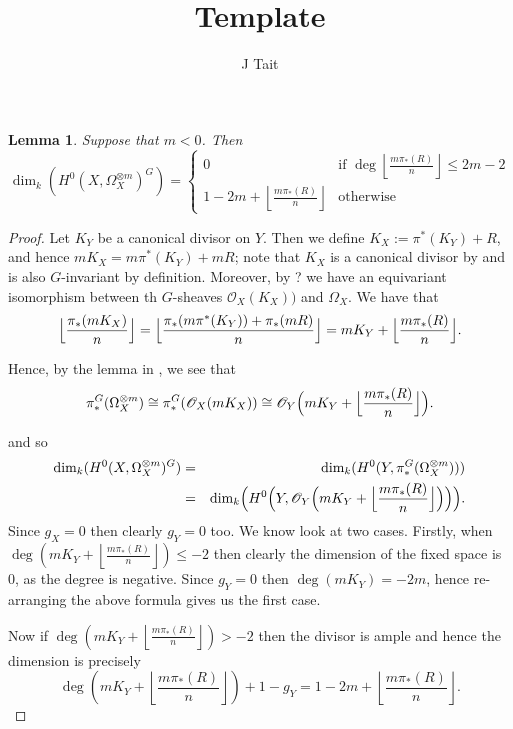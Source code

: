 \documentclass[11pt]{article} %
\title{Template}
\author{J Tait}
\newtheorem{lem}{Lemma}
\begin{document}
\maketitle

\begin{lem}
  Suppose that $m<0$. Then
  \begin{equation*}
    \dim_k(H^0(X,\Omega_X^{\otimes m})^G)=
      \begin{cases}
	0 & \mbox{if }\deg\left\lfloor \frac{m\pi_*(R)}{n} \right\rfloor\leq 2m-2\\
	1-2m+\left\lfloor \frac{m\pi_*(R)}{n} \right\rfloor & \mbox{otherwise}
      \end{cases}
  \end{equation*}
\end{lem}
\begin{proof}
  Let $K_Y$ be a canonical divisor on $Y$. Then we define $K_X:=\pi^*(K_Y)+R$, and hence $mK_X=m\pi^*(K_Y)+mR$; note that $K_X$ is a canonical divisor by \citep[Chap. IV,\ prop 2.3]{hart} and is also $G$-invariant by definition. Moreover, by ? we have an equivariant isomorphism between th $G$-sheaves $\mathscr{O}_X(K_X))$ and $\Omega_X$. We have that
	\[ 
		\Big{\lfloor}{\frac{\pi_*(mK_X)}{n}} \Big{\rfloor}
		= \Big{\lfloor}{\frac{\pi_*(m\pi^*(K_Y))+\pi_*(mR)}{n}} \Big{\rfloor}
		= mK_Y+\Big{\lfloor} {\frac{m\pi_*(R)}{n}}\Big{\rfloor}.
	\]
	
Hence, by the lemma in \citep{faithfulaction}, we see that 
	\[
		\pi_*^G(\Omega_X^{\otimes m})\cong \pi_*^G(\mathscr{O}_X(mK_X))\cong \mathscr{O}_Y\Big(mK_Y 			+\Big{\lfloor}{\frac{m\pi_*(R)}{n}}\Big{\rfloor}\Big).
	\]

and so
	\begin{eqnarray*}
		\mbox{dim}_k(H^0(X,\Omega_{X}^{\otimes m})^G)&=&
		\mbox{dim}_k(H^0(Y,\pi_*^G(\Omega_{X}^{\otimes m})))\\
		&=&\mbox{dim}_k\Big(H^0\Big(Y,\mathscr{O}_Y\Big(mK_Y+\Big{\lfloor}{\frac{m\pi_*(R)}						{n}}\Big{\rfloor}\Big)\Big)\Big).
	\end{eqnarray*}
Since $g_X=0$ then clearly $g_Y=0$ too.
We know look at two cases.
Firstly, when $\deg(mK_Y+\left\lfloor \frac{m\pi_*(R)}{n} \right\rfloor)\leq -2$ then clearly the dimension of the fixed space is $0$, as the degree is negative.
Since $g_Y=0$ then $\deg(mK_Y)=-2m$, hence re-arranging the above formula gives us the first case.

Now if $\deg(mK_Y+\left\lfloor \frac{m\pi_*(R)}{n} \right\rfloor)>-2$ then the divisor is ample and hence the dimension is precisely
  \begin{equation}
    \deg(mK_Y+\left\lfloor \frac{m\pi_*(R)}{n} \right\rfloor)+1-g_Y=1-2m+\left\lfloor \frac{m\pi_*(R)}{n} \right\rfloor.
  \end{equation}
\end{proof}




\end{document}
